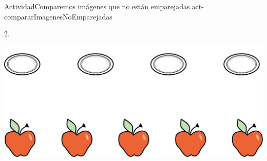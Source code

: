 \documentclass[20pt]{extarticle}
\begin{document}
\begin{activity}{Actividad}{Comparemos imágenes que no están emparejadas.}{act-compararImagenesNoEmparejadas}
\begin{image}{0}{1}{0}{}
\end{image}%
2.%
\begin{image}{0}{0.5}{0.5}{}%
\includegraphics[max width=\linewidth, center]{external/png-source/plates apples.png}
\end{image}%
\begin{image}{0}{1}{0}{}%

\end{image}
\end{activity}
\end{document}
